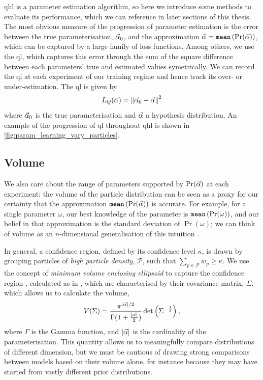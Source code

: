 \gls{qhl} is a parameter estimation algorithm, so here we introduce some methods to evaluate its performance, 
which we can reference in later sections of this thesis. 
The most obvious measure of the progression of parameter estimation is the error between the true parameterisation, 
$\vec{\alpha}_0$, and the approximation $\vec{\alpha} = \texttt{mean} \left( \Pr(\vec{\alpha}) \right)$,
which can be captured by a large family of loss functions. 
Among others, we use the \gls{ql}, which captures this error through the sum of the square difference between 
each parameters' true and estimated values symetrically.
We can record the \gls{ql} at each \gls{experiment} of our training regime and hence track its over- or under-estimation. 
The \gls{ql} is given by 
\begin{equation}
    \label{eqn:quadratic_loss}
    L_{Q}(\vec{\alpha}) = \left\| \vec{\alpha}_0 - \vec{\alpha} \right\|^2
\end{equation}
where $\vec{\alpha}_0$ is the true parameterisation and $\vec{\alpha}$ a hypothesis distribution.
An example of the progression of \gls{ql} throughout \gls{qhl} is shown in \cref{fig:param_learning_vary_particles}.
\par 

\subsection{Volume}\label{sec:volume}
We also care about the range of parameters supported by $\Pr(\vec{\alpha})$ at each experiment: 
the \gls{volume} of the \gls{particle} distribution can be seen as a proxy for our certainty
that the approximation $\texttt{mean}\left(\Pr(\vec{\alpha})\right) $ is accurate. 
For example, for a single parameter $\omega$, our best knowledge of the parameter is $\texttt{mean}\left( \Pr(\omega) \right)$, 
and our belief in that approximation is the standard deviation of $\Pr(\omega)$; 
we can think of \gls{volume} as an $n$-dimensional generalisation of this intuition \cite{qinfer-1_0, ferrie2014high}. 
\par 
In general, a confidence region, defined by its confidence level $\kappa$, is drawn by grouping \glspl{particle} 
of \emph{high \gls{particle} density}, $\mathcal{P}$, such that $\sum\limits_{p \in \mathcal{P}} w_{p} \geq \kappa$.
We use the concept of \emph{minimum volume enclosing ellipsoid}
to capture the confidence region \cite{ferrie2014high}, calculated as in \cite{todd2007khachiyan}, 
which are characterised by their covariance matrix, $\Sigma$, which allows us to calculate the \gls{volume}, 
\begin{equation}
    \label{eqn:volume}
    V(\Sigma) = \frac{ \pi^{| \vec{\alpha} | / 2}}{ \Gamma(1 + \frac{| \vec{\alpha} |}{2})} \det\left(\Sigma^{-\frac{1}{2}}\right),
\end{equation}
where $\Gamma$ is the Gamma function, and $|\vec{\alpha}|$ is the cardinality of the parameterisation. 
This quantity allows us to meaningfully compare distributions of different dimension, 
but we must be cautious of drawing strong comparisons between models based on 
their \gls{volume} alone, for instance because they may have started from vastly different prior distributions. 
\par 

